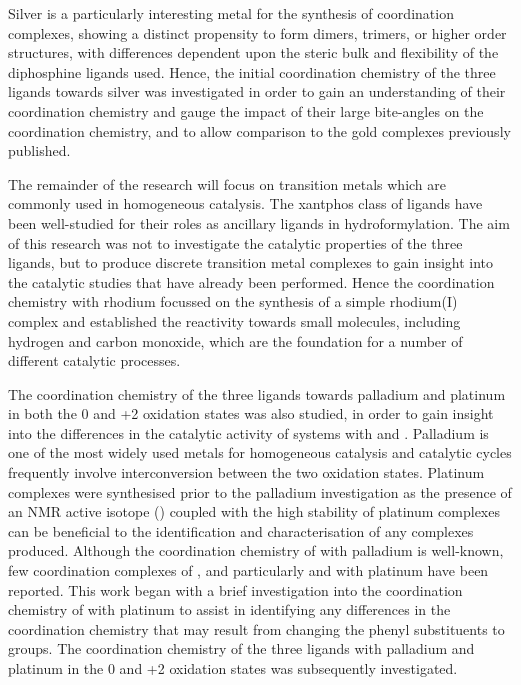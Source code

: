 Silver is a particularly interesting metal for the synthesis of coordination complexes, showing a distinct propensity to form dimers, trimers, or higher order structures, with differences dependent upon the steric bulk and flexibility of the diphosphine ligands used.\cite{Meijboom2009}  Hence, the initial coordination chemistry of the three \tBuxantphos{} ligands towards silver was investigated in order to gain an understanding of their coordination chemistry and gauge the impact of their large bite-angles on the coordination chemistry, and to allow comparison to the gold \tBuxantphos{} complexes previously published.

The remainder of the research will focus on transition metals which are commonly used in homogeneous catalysis.  The xantphos class of ligands have been well-studied for their roles as ancillary ligands in hydroformylation.\cite{Veen1998, Veen1999b, Veen2002, Zuidema2008, Petocz2004, Bronger2003, Kranenburg1995}  The aim of this research was not to investigate the catalytic properties of the three \tBuxantphos{} ligands, but to produce discrete transition metal complexes to gain insight into the catalytic studies that have already been performed.  Hence the coordination chemistry with rhodium focussed on the synthesis of a simple rhodium(I) complex and established the reactivity towards small molecules, including hydrogen and carbon monoxide, which are the foundation for a number of different catalytic processes.  

The coordination chemistry of the three \tBuxantphos{} ligands towards palladium and platinum in both the 0 and +2 oxidation states was also studied, in order to gain insight into the differences in the catalytic activity of systems with \tBuxantphos{} and \Phxantphos{}.  Palladium is one of the most widely used metals for homogeneous catalysis and catalytic cycles frequently involve interconversion between the two oxidation states.\cite{Tsuji1995}  Platinum complexes were synthesised prior to the palladium investigation as the presence of an NMR active isotope (\Pt) coupled with the high stability of platinum complexes can be beneficial to the identification and characterisation of any complexes produced.  Although the coordination chemistry of \Phxantphos{} with palladium is well-known, few coordination complexes of \Phxantphos{}, and particularly \Phthixantphos{} and \Phsixantphos{} with platinum have been reported.  This work began with a brief investigation into the coordination chemistry of \Phthixantphos{} with platinum to assist in identifying any differences in the coordination chemistry that may result from changing the phenyl substituents to \tBu{} groups.  The coordination chemistry of the three \tBuxantphos{} ligands with palladium and platinum in the 0 and +2 oxidation states was subsequently investigated.

